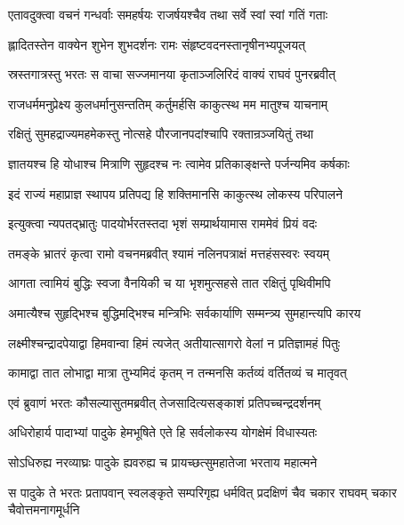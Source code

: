 \twolineshloka
{एतावदुक्त्वा वचनं गन्धर्वाः समहर्षयः}
{राजर्षयश्चैव तथा सर्वे स्वां स्वां गतिं गताः} %

\twolineshloka
{ह्लादितस्तेन वाक्येन शुभेन शुभदर्शनः}
{रामः संहृष्टवदनस्तानृषीनभ्यपूजयत्} %

\twolineshloka
{स्रस्तगात्रस्तु भरतः स वाचा सज्जमानया}
{कृताञ्जलिरिदं वाक्यं राघवं पुनरब्रवीत्} %

\twolineshloka
{राजधर्ममनुप्रेक्ष्य कुलधर्मानुसन्ततिम्}
{कर्तुमर्हसि काकुत्स्थ मम मातुश्च याचनाम्} %

\twolineshloka
{रक्षितुं सुमहद्राज्यमहमेकस्तु नोत्सहे}
{पौरजानपदांश्चापि रक्तान्रञ्जयितुं तथा} %

\twolineshloka
{ज्ञातयश्च हि योधाश्च मित्राणि सुहृदश्च नः}
{त्वामेव प्रतिकाङ्क्षन्ते पर्जन्यमिव कर्षकाः} %

\twolineshloka
{इदं राज्यं महाप्राज्ञ स्थापय प्रतिपद्य हि}
{शक्तिमानसि काकुत्स्थ लोकस्य परिपालने} %

\twolineshloka
{इत्युक्त्वा न्यपतद्भ्रातुः पादयोर्भरतस्तदा}
{भृशं सम्प्रार्थयामास राममेवं प्रियं वदः} %

\twolineshloka
{तमङ्के भ्रातरं कृत्वा रामो वचनमब्रवीत्}
{श्यामं नलिनपत्राक्षं मत्तहंसस्वरः स्वयम्} %

\twolineshloka
{आगता त्वामियं बुद्धिः स्वजा वैनयिकी च या}
{भृशमुत्सहसे तात रक्षितुं पृथिवीमपि} %

\twolineshloka
{अमात्यैश्च सुहृद्भिश्च बुद्धिमद्भिश्च मन्त्रिभिः}
{सर्वकार्याणि सम्मन्त्र्य सुमहान्त्यपि कारय} %

\twolineshloka
{लक्ष्मीश्चन्द्रादपेयाद्वा हिमवान्वा हिमं त्यजेत्}
{अतीयात्सागरो वेलां न प्रतिज्ञामहं पितुः} %

\twolineshloka
{कामाद्वा तात लोभाद्वा मात्रा तुभ्यमिदं कृतम्}
{न तन्मनसि कर्तव्यं वर्तितव्यं च मातृवत्} %

\twolineshloka
{एवं ब्रुवाणं भरतः कौसल्यासुतमब्रवीत्}
{तेजसादित्यसङ्काशं प्रतिपच्चन्द्रदर्शनम्} %

\twolineshloka
{अधिरोहार्य पादाभ्यां पादुके हेमभूषिते}
{एते हि सर्वलोकस्य योगक्षेमं विधास्यतः} %

\twolineshloka
{सोऽधिरुह्य नरव्याघ्रः पादुके ह्यवरुह्य च}
{प्रायच्छत्सुमहातेजा भरताय महात्मने} %

\fourlineindentedshloka
{स पादुके ते भरतः प्रतापवान्}
{स्वलङ्कृते सम्परिगृह्य धर्मवित्}
{प्रदक्षिणं चैव चकार राघवम्}
{चकार चैवोत्तमनागमूर्धनि} %


